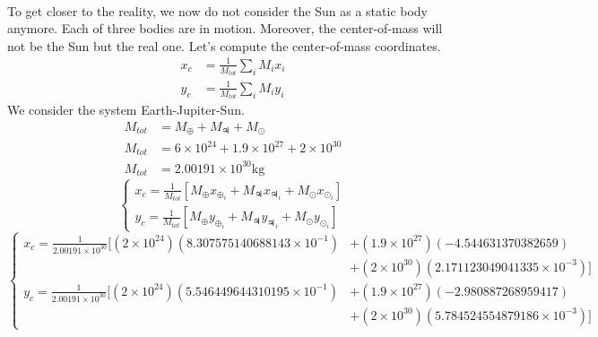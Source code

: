 \documentclass[a4paper, twoside, 11pt]{report}
\theoremstyle{theorem}
\theoremstyle{remark}
\theoremstyle{exemple}
\begin{document}
            \paragraph{}To get closer to the reality, we now do not consider the Sun as a static body anymore. Each of three bodies are in motion. Moreover, the center-of-mass will not be the Sun but the real one. Let's compute the center-of-mass coordinates.
                \begin{align*}
                    x_c &= \frac{1}{M_{tot}}\sum\limits_{i} M_i x_i\\
                    y_c &= \frac{1}{M_{tot}}\sum\limits_{i} M_i y_i
                \end{align*}
            We consider the system Earth-Jupiter-Sun.
                \begin{align*}
                    M_{tot} &= M_{\oplus} + M_{\jupiter} + M_{\odot} \\
                    M_{tot} &= 6\times10^{24} + 1.9\times 10^{27} + 2 \times 10^{30}\\
                    M_{tot} &= 2.00191 \times 10^{30} \mathrm{kg}
                \end{align*}
                \begin{equation*}
                    \left\{
                        \begin{aligned}
                            x_c = \frac{1}{M_{tot}} [M_{\oplus} x_{\oplus_i} + M_{\jupiter} x_{\jupiter_i} + M_{\odot} x_{\odot_i}] \\
                            y_c = \frac{1}{M_{tot}} [M_{\oplus} y_{\oplus_i} + M_{\jupiter} y_{\jupiter_i} + M_{\odot} y_{\odot_i}]
                        \end{aligned}
                    \right.
                \end{equation*} 
                \begin{equation*}
                    \left\{
                        \begin{aligned}
                            x_c = \frac{1}{2.00191 \times 10^{30}} [(2 \times 10^{24})( 8.307575140688143 \times 10^{-1}) &+ (1.9 \times 10^{27}) (-4.544631370382659) \\
                            &+ (2 \times 10^{30}) (2.171123049041335 \times 10^{-3})] \\
                            y_c = \frac{1}{2.00191 \times 10^{30}} [(2 \times 10^{24}) (5.546449644310195 \times 10^{-1}) &+ (1.9 \times 10^{27}) (-2.980887268959417) \\
                            &+ (2 \times 10^{30}) (5.784524554879186 \times 10^{-3})]
                        \end{aligned}
                    \right.
                \end{equation*}
\end{document}
